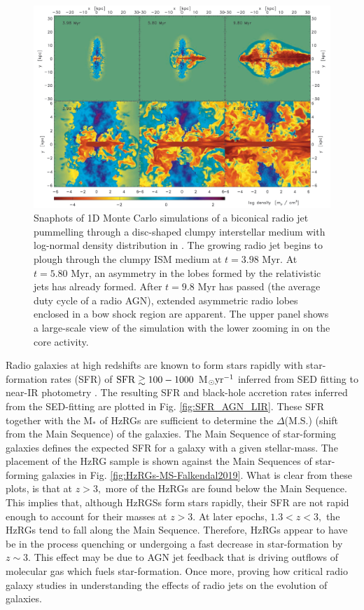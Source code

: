\documentclass[10pt,a4paper]{article}
\begin{document}
\begin{figure}[!ht]
  \centering
  \includegraphics[width=\textwidth]{plots_chp1/jet_gas_sims_Gaibler_2011.png}
  \caption[Simulation snapshots of biconical radio jet from \citet{Gaibler2011}]{Snaphots of 1D Monte Carlo simulations of a biconical radio jet pummelling through a disc-shaped clumpy interstellar medium with log-normal density distribution in \citet{Gaibler2011}. The growing radio jet begins to plough through the clumpy ISM medium at $t=3.98$ Myr. At $t=5.80$ Myr, an asymmetry in the lobes formed by the relativistic jets has already formed. After $t=9.8$ Myr has passed (the average duty cycle of a radio AGN), extended asymmetric radio lobes enclosed in a bow shock region are apparent. The upper panel shows a large-scale view of the simulation with the lower zooming in on the core activity.}
  \label{fig:jet-ism-Gaibler2011}
\end{figure}

Radio galaxies at high redshifts are known to form stars rapidly with star-formation rates (SFR) of $\rm SFR \gtrsim 100 - 1000$ M$_\odot \rm yr^{-1}$ inferred from SED fitting to near-IR photometry \citep{Drouart2014,Falkendal2019}. The resulting SFR and black-hole accretion rates inferred from the SED-fitting are plotted in Fig. \ref{fig:SFR_AGN_LIR}. These SFR together with the M$_*$ of HzRGs are sufficient to determine the $\Delta$(M.S.) (shift from the Main Sequence) of the galaxies. The Main Sequence of star-forming galaxies defines the expected SFR for a galaxy with a given stellar-mass. The placement of the \citet{Falkendal2019} HzRG sample is shown against the Main Sequences of star-forming galaxies in Fig. \ref{fig:HzRGs-MS-Falkendal2019}. What is clear from these plots, is that at $z > 3,$ more of the HzRGs are found below the Main Sequence. This implies that, although HzRGSs form stars rapidly, their SFR are not rapid enough to account for their masses at $z > 3.$ At later epochs, $ 1.3 < z < 3,$ the HzRGs tend to fall along the Main Sequence. Therefore, HzRGs appear to have be in the process quenching or undergoing a fast decrease in star-formation by $z\sim3.$ This effect may be due to AGN jet feedback that is driving outflows of molecular gas which fuels star-formation. Once more, proving how critical radio galaxy studies in understanding the effects of radio jets on the evolution of galaxies. 
\end{document}
